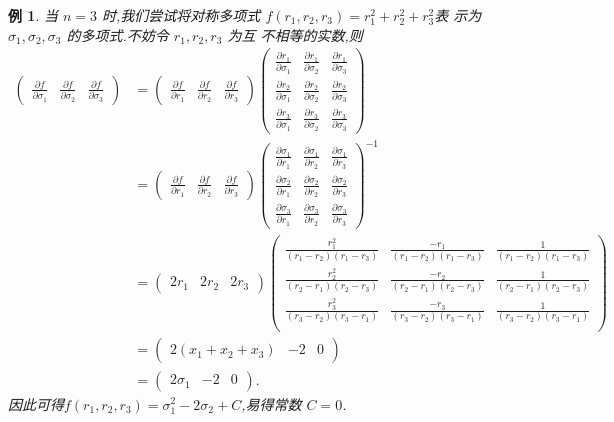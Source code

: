 \documentclass[a4paper]{article}
\newtheorem{example}{例}[section]
\newcommand{\pa}{\partial} \newcommand{\Om}{\Omega}
\begin{document}
\begin{example}
  当 $n=3$ 时,我们尝试将对称多项式 $f(r_1,r_2,r_3)=r_1^2+r_2^2+r_3^2$表
  示为 $\sigma_1,\sigma_2,\sigma_3$ 的多项式.不妨令 $r_1,r_2,r_3$ 为互
  不相等的实数,则
\begin{align*}
  \begin{pmatrix}
    \frac{\pa f}{\pa \sigma_1}&\frac{\pa f}{\pa \sigma_2}&\frac{\pa
      f}{\pa \sigma_3}
  \end{pmatrix}&=\begin{pmatrix} \frac{\pa f}{\pa r_1}&\frac{\pa
      f}{\pa r_2}&\frac{\pa f}{\pa r_3}
  \end{pmatrix}\begin{pmatrix}
    \frac{\pa r_1}{\pa \sigma_1}&\frac{\pa r_1}{\pa
      \sigma_2}&\frac{\pa
      r_1}{\pa \sigma_3}\\
    \frac{\pa r_2}{\pa \sigma_1}&\frac{\pa r_2}{\pa
      \sigma_2}&\frac{\pa
      r_2}{\pa \sigma_3}\\
    \frac{\pa r_3}{\pa \sigma_1}&\frac{\pa r_3}{\pa
      \sigma_2}&\frac{\pa r_3}{\pa \sigma_3}
  \end{pmatrix}\\&=\begin{pmatrix}
    \frac{\pa f}{\pa r_1}&\frac{\pa f}{\pa r_2}&\frac{\pa f}{\pa r_3}
  \end{pmatrix}\begin{pmatrix}
    \frac{\pa \sigma_1}{\pa r_1}&\frac{\pa \sigma_1}{\pa
      r_2}&\frac{\pa \sigma_1}{\pa r_3}\\
\frac{\pa \sigma_2}{\pa r_1}&\frac{\pa \sigma_2}{\pa r_2}&\frac{\pa
  \sigma_2}{\pa r_3}\\
\frac{\pa\sigma_3}{\pa r_1}&\frac{\pa \sigma_3}{\pa r_2}&\frac{\pa
  \sigma_3}{\pa r_3}
  \end{pmatrix}^{-1}\\&=\begin{pmatrix}
    2r_1&2r_2&2r_3
  \end{pmatrix}\begin{pmatrix}
  \frac{r_1^2}{(r_1-r_2)(r_1-r_3)}&\frac{-r_1}{(r_1-r_2)(r_1-r_3)}&\frac{1}{(r_1-r_2)(r_1-r_3)}\\
  \frac{r_2^2}{(r_2-r_1)(r_2-r_3)}&\frac{-r_2}{(r_2-r_1)(r_2-r_3)}&\frac{1}{(r_2-r_1)(r_2-r_3)}\\
  \frac{r_3^2}{(r_3-r_2)(r_3-r_1)}&\frac{-r_3}{(r_3-r_2)(r_3-r_1)}&\frac{1}{(r_3-r_2)(r_3-r_1)}\\    
  \end{pmatrix}\\&=\begin{pmatrix}
    2(x_1+x_2+x_3)&-2&0
  \end{pmatrix}\\&=\begin{pmatrix}
    2\sigma_1&-2&0
  \end{pmatrix}.
\end{align*}
因此可得$f(r_1,r_2,r_3)=\sigma_1^2-2\sigma_2+C$,易得常数 $C=0$.
\end{example}
\end{document}
